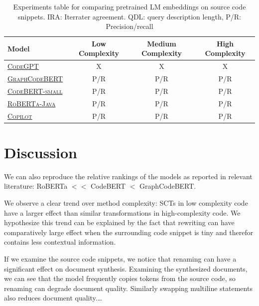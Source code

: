 \documentclass[sigconf,review,anonymous]{acmart}
\begin{document}
    {
    \renewcommand{\arraystretch}{1.5}
    \begin{table}[H]
      \footnotesize
      \begin{tabular}{l|ccc}
        Model & Low Complexity & Medium Complexity & High Complexity \\
        \hline
        \href{https://huggingface.co/microsoft/CodeGPT-small-java}{\textsc{CodeGPT}}~\citep{lu2021codexglue} & X & X & X \\
        \href{https://huggingface.co/microsoft/graphcodebert-base}{\textsc{GraphCodeBERT}}~\citep{guo2021graphcodebert} & P/R & P/R & P/R \\
        \href{https://huggingface.co/huggingface/CodeBERTa-small-v1a}{\textsc{CodeBERT-small}}~\citep{feng2020codebert} & P/R & P/R & P/R \\
        \href{https://huggingface.co/dbernsohn/roberta-java}{\textsc{RoBERTa-Java}}~\citep{liu2019roberta} & P/R & P/R & P/R \\
        \href{https://copilot.github.com/}{\textsc{Copilot}}\citep{chen2021evaluating} & P/R & P/R & P/R \\

      \end{tabular}
      \caption{\label{tab:code_completion} Experiments table for comparing pretrained LM embeddings on source code snippets. IRA: Iterrater agreement. QDL: query description length, P/R: Precision/recall}
    \end{table}
  }

  \section{Discussion}


  We can also reproduce the relative rankings of the models as reported in relevant literature: RoBERTa $<<$ CodeBERT $<$ GraphCodeBERT.

  We observe a clear trend over method complexity: SCTs in low complexity code have a larger effect than similar transformations in high-complexity code. We hypothesize this trend can be explained by the fact that rewriting can have comparatively large effect when the surrounding code snippet is tiny and therefor contains less contextual information.

  If we examine the source code snippets, we notice that renaming can have a significant effect on document synthesis. Examining the synthesized documents, we can see that the model frequently copies tokens from the source code, so renaming can degrade document quality. Similarly swapping multiline statements also reduces document quality.\ldots
\end{document}
